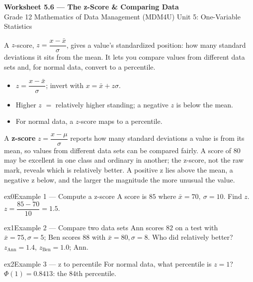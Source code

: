 \documentclass[11pt]{article}
\begin{document}
\begin{center}
{\LARGE\bfseries\color{titleblue}Worksheet 5.6 --- The z-Score \& Comparing Data}\\[2pt]
{\small Grade 12 Mathematics of Data Management (MDM4U) \textperiodcentered{} Unit 5: One-Variable Statistics}
\end{center}

\begin{ideabox}
A $z$-score, $z=\dfrac{x-\bar x}{\sigma}$, gives a value's standardized position: how many standard deviations it sits from the mean. It lets you compare values from different data sets and, for normal data, convert to a percentile.
\begin{itemize}[leftmargin=*,itemsep=2pt]
  \item $z=\dfrac{x-\bar x}{\sigma}$; invert with $x=\bar x+z\sigma$.
  \item Higher $z$ $=$ relatively higher standing; a negative $z$ is below the mean.
  \item For normal data, a $z$-score maps to a percentile.
\end{itemize}
\end{ideabox}

\begin{learnbox}
A \textbf{z-score} $z=\dfrac{x-\mu}{\sigma}$ reports how many standard deviations a value is from its mean, so values from different data sets can be compared fairly.
A score of $80$ may be excellent in one class and ordinary in another; the z-score, not the raw mark, reveals which is relatively better.
A positive z lies above the mean, a negative z below, and the larger the magnitude the more unusual the value.
\end{learnbox}


\begin{example}{ex0}{Example 1 --- Compute a z-score}
A score is $85$ where $\bar x=70,\ \sigma=10$. Find $z$.\soln $z=\dfrac{85-70}{10}=1.5$.
\end{example}

\begin{example}{ex1}{Example 2 --- Compare two data sets}
Ann scores $82$ on a test with $\bar x=75,\sigma=5$; Ben scores $88$ with $\bar x=80,\sigma=8$. Who did relatively better?\soln $z_{\text{Ann}}=1.4$, $z_{\text{Ben}}=1.0$; Ann.
\end{example}

\begin{example}{ex2}{Example 3 --- z to percentile}
For normal data, what percentile is $z=1$?\soln $\Phi(1)=0.8413$: the $84$th percentile.
\end{example}
\end{document}
